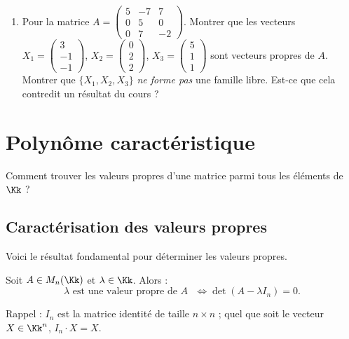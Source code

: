 \documentclass[11pt, class=report,crop=false]{standalone}
\begin{document}
\begin{miniexercices}
\begin{enumerate}
  \item Pour la matrice $A = \left(\begin{smallmatrix}
  5 & -7 & 7 \\
0 & 5 & 0 \\
0 & 7 & -2\end{smallmatrix}\right)$.
  Montrer que les vecteurs 
  $X_1 = \left(\begin{smallmatrix}3\\-1\\-1 \end{smallmatrix}\right)$, $X_2 = \left(\begin{smallmatrix}0\\2\\2\end{smallmatrix}\right)$, $X_3 =  \left(\begin{smallmatrix}5\\1\\1\end{smallmatrix}\right)$ 
  sont vecteurs propres de $A$. Montrer que 
  $\{X_1 , X_2 , X_3\}$ \emph{ne forme pas} une famille libre. Est-ce que cela contredit un résultat
  du cours ? 
\end{enumerate}
\end{miniexercices}

\section{Polynôme caractéristique}

Comment trouver les valeurs propres d'une matrice parmi tous les éléments de $\Kk$  ?

\subsection{Caractérisation des valeurs propres}

Voici le résultat fondamental pour déterminer les valeurs propres.

\begin{proposition}
\label{prop:vprac}
Soit $A \in M_n(\Kk)$ et $\lambda \in \Kk$. Alors :
\[\lambda \text{ est une valeur propre de $A$ } \iff \det (A-\lambda I_n) = 0 .\]
\end{proposition}

Rappel : $I_n$ est la matrice identité de taille $n\times n$ ; quel que soit le vecteur $X \in \Kk^n$,
$I_n \cdot X = X$.
\end{document}
